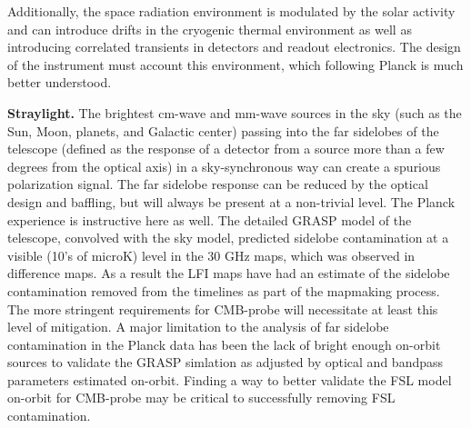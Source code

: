 Additionally, the space radiation environment is modulated by the solar activity and
can introduce drifts in the cryogenic thermal environment as well as
introducing correlated transients in detectors and readout
electronics.  The design of the instrument must account this
environment, which following Planck is much better understood.

\textbf{Straylight.}   The brightest cm-wave and mm-wave sources in
the sky (such as the Sun, Moon, planets, and Galactic center) passing
into the far sidelobes of the telescope (defined as the response of a
detector from a source more than a few degrees from the optical axis)
in a sky-synchronous way can create a spurious polarization signal.
The far sidelobe response can be reduced by the optical design and baffling, but will always be present at a non-trivial level.  The Planck experience is instructive here as well.  The detailed GRASP model of the telescope, convolved with the sky model, predicted sidelobe contamination at a visible (10's of microK) level in the 30 GHz maps, which was observed in difference maps.  As a result the LFI maps have had an estimate of the sidelobe contamination removed from the timelines as part of the mapmaking process. The more stringent requirements for CMB-probe will necessitate at least this level of mitigation.  A major limitation to the analysis of far sidelobe contamination in the Planck data has been the lack of bright enough on-orbit sources to validate the GRASP simlation as adjusted by optical and bandpass parameters estimated on-orbit. Finding a way to better validate the FSL model on-orbit for CMB-probe may be critical to successfully removing FSL contamination.


